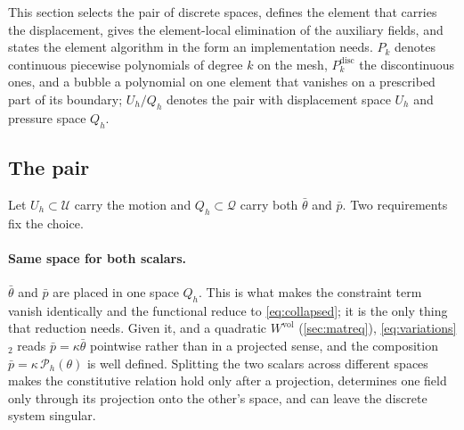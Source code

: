 \documentclass{article}
\newcommand{\supvol}{^{\mathrm{vol}}}
\theoremstyle{definition}
\theoremstyle{plain}
\begin{document}
This section selects the pair of discrete spaces, defines the element that
carries the displacement, gives the element-local elimination of the
auxiliary fields, and states the element algorithm in the form an
implementation needs. $P_k$ denotes continuous piecewise
polynomials of degree $k$ on the mesh, $P_k^{\mathrm{disc}}$ the discontinuous
ones, and a bubble a polynomial on one element that vanishes on a prescribed
part of its boundary; $U_h/Q_h$ denotes the pair with displacement space
$U_h$ and pressure space $Q_h$.

\subsection{The pair}
\label{sec:fe-spaces}

Let $U_h \subset \mathcal{U}$ carry the motion and $Q_h \subset \mathcal{Q}$
carry both $\bar\theta$ and $\bar p$. Two requirements fix the choice.

\paragraph{Same space for both scalars.} $\bar\theta$ and $\bar p$ are placed in one
space $Q_h$. This is what makes the constraint term vanish identically and the
functional reduce to \eqref{eq:collapsed}; it is the only thing that reduction
needs. Given it, and a quadratic $W\supvol$ (\cref{sec:matreq}),
\eqref{eq:variations}$_2$ reads $\bar p = \kappa\bar\theta$ pointwise rather
than in a projected sense, and the composition
$\bar p = \kappa\,\mathcal{P}_h(\theta)$ is well defined. Splitting the two scalars
across different spaces makes the constitutive relation hold only after a
projection, determines one field only through its projection onto the other's
space, and can leave the discrete system singular.
\end{document}
